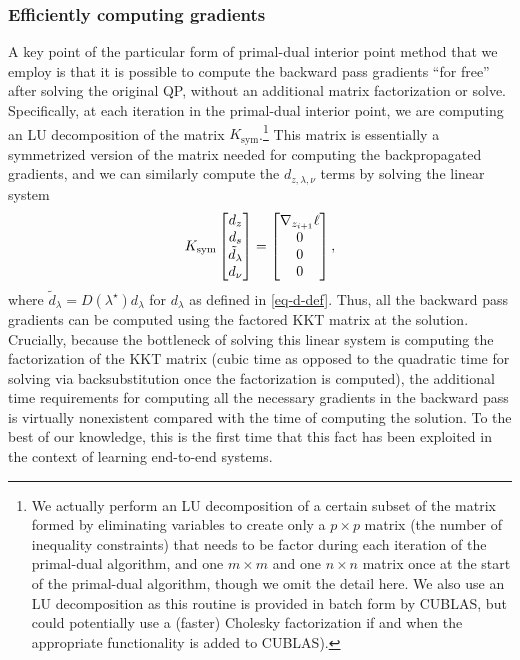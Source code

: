 \subsubsection{Efficiently computing gradients}
\label{sec:optnet:qp-solver-grads}
A key point of the particular form of primal-dual interior point method that we
employ is that it is possible to compute the backward pass gradients ``for
free'' after solving the original QP, without an additional matrix factorization
or solve.  Specifically, at each iteration in the primal-dual interior point, we
are computing an LU decomposition of the matrix $K_{\mathrm{sym}}$.\footnote{We
actually perform an LU decomposition of a certain subset of the matrix formed
by eliminating variables to create only a $p \times p$ matrix (the number of
inequality constraints) that needs to be factor during each iteration of the
primal-dual algorithm, and one $m \times m$ and one $n \times n$ matrix once at
the start of the primal-dual algorithm, though we omit the detail here.  We also
use an LU decomposition as this routine is provided in batch form by CUBLAS, but
could potentially use a (faster) Cholesky factorization if and when the
appropriate functionality is added to CUBLAS).}  This matrix is essentially a
symmetrized version of the matrix needed for computing the backpropagated
gradients, and we can similarly compute the $d_{z,\lambda,\nu}$ terms by solving
the linear system
\begin{equation}
  K_{\rm sym}
  \begin{bmatrix}
    d_z \\
    d_s \\
    \tilde{d}_\lambda \\
    d_\nu \\
  \end{bmatrix}
  =
  \begin{bmatrix}
    \nabla_{z_{i+1}} \ell \\
    0 \\
    0 \\
    0 \\
  \end{bmatrix},
  \label{eq:grads-system}
\end{equation}
where $\tilde{d}_\lambda = D(\lambda^\star) d_\lambda$ for $d_\lambda$ as
defined in \eqref{eq-d-def}.  Thus, all the backward pass gradients can be computed
using the factored KKT matrix at the solution.  Crucially, because the
bottleneck of solving this linear system is computing the factorization of the
KKT matrix (cubic time as opposed to the quadratic time for solving via
backsubstitution once the factorization is computed), the additional time
requirements for computing all the necessary gradients in the backward pass is
virtually nonexistent compared with the time of computing the solution.  To the
best of our knowledge, this is the first time that this fact has been exploited
in the context of learning end-to-end systems.

